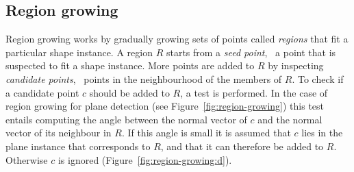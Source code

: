 

\subsection{Region growing}
Region growing works by gradually growing sets of points called \emph{regions} that fit a particular shape instance.
A region $R$ starts from a \emph{seed point}, \ie\ a point that is suspected to fit a shape instance.
More points are added to $R$ by inspecting \emph{candidate points}, \ie\ points in the neighbourhood of the members of $R$.
To check if a candidate point $c$ should be added to $R$, a test is performed.
In the case of region growing for plane detection (see Figure~\ref{fig:region-growing}) this test entails computing the angle between the normal vector of $c$ and the normal vector of its neighbour in $R$.
If this angle is small it is assumed that $c$ lies in the plane instance that corresponds to $R$, and that it can therefore be added to $R$.
Otherwise $c$ is ignored (Figure~\ref{fig:region-growing:d}).
